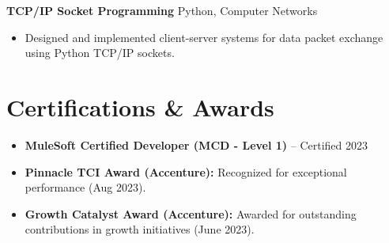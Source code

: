 \documentclass[letterpaper,10pt]{article}
\begin{document}
    \textbf{TCP/IP Socket Programming} \hfill Python, Computer Networks
    \begin{itemize}[leftmargin=*]
        \item Designed and implemented client-server systems for data packet exchange using Python TCP/IP sockets.
    \end{itemize}

\section*{Certifications \& Awards}
    \begin{itemize}[leftmargin=*] \itemsep 0pt
        \item \textbf{MuleSoft Certified Developer (MCD - Level 1)} -- Certified 2023
        \item \textbf{Pinnacle TCI Award (Accenture):} Recognized for exceptional performance (Aug 2023).
        \item \textbf{Growth Catalyst Award (Accenture):} Awarded for outstanding contributions in growth initiatives (June 2023).
    \end{itemize}
\end{document}
